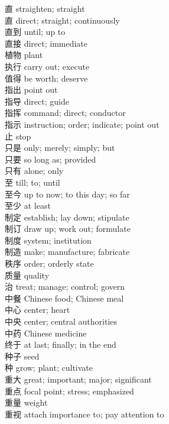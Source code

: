直 \quad straighten; straight\\
直 \quad direct; straight; continuously\\
直到 \quad until; up to\\
直接 \quad direct; immediate\\
植物 \quad plant\\
执行 \quad carry out; execute\\
值得 \quad be worth; deserve\\
指出 \quad point out\\
指导 \quad direct; guide\\
指挥 \quad command; direct; conductor\\
指示 \quad instruction; order; indicate; point out\\
止 \quad stop\\
只是 \quad only; merely; simply; but\\
只要 \quad so long as; provided\\
只有 \quad alone; only\\
至 \quad till; to; until\\
至今 \quad up to now; to this day; so far\\
至少 \quad at least\\
制定 \quad establish; lay down; stipulate\\
制订 \quad draw up; work out; formulate\\
制度 \quad system; institution\\
制造 \quad make; manufacture; fabricate\\
秩序 \quad order; orderly state\\
质量 \quad quality\\
治 \quad treat; manage; control; govern\\
中餐 \quad Chinese food; Chinese meal\\
中心 \quad center; heart\\
中央 \quad center; central authorities\\
中药 \quad Chinese medicine\\
终于 \quad at last; finally; in the end\\
种子 \quad seed\\
种 \quad grow; plant; cultivate\\
重大 \quad great; important; major; significant\\
重点 \quad focal point; stress; emphasized\\
重量 \quad weight\\
重视 \quad attach importance to; pay attention to\\
